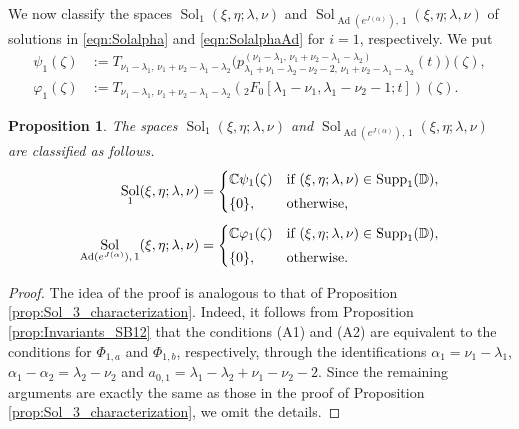 \documentclass[a4paper,11pt,reqno]{amsart}
\newcommand{\DD}{\mathbb{D}}
\newcommand{\0}{{\bf 0}}
\newcommand{\C}{\mathbb{C}}
\newcommand{\1}{{\bf 1}}
\DeclareMathOperator{\Ad}{Ad}
\DeclareMathOperator{\Supp}{Supp}
\DeclareMathOperator{\Sol}{Sol}
\theoremstyle{plain}
\newtheorem{proposition}[equation]{Proposition}
\theoremstyle{definition}
\numberwithin{equation}{section}
\theoremstyle{definition}
\begin{document}
We now classify the spaces 
$\Sol_1(\xi, \eta; \lambda, \nu)$ and 
$\Sol_{\Ad(e^{J(\alpha)}),\, 1}(\xi,\eta; \lambda,\nu)$  of solutions
in \eqref{eqn:Solalpha} and \eqref{eqn:SolalphaAd} for $i=1$, respectively.
We put
\begin{align*}
\psi_1(\zeta) &:= 
T_{\nu_1-\lambda_1,\,\nu_1+\nu_2-\lambda_1-\lambda_2}
\big(p_{\lambda_1+\nu_1-\lambda_2-\nu_2-2,\,\nu_1+\nu_2-\lambda_1-\lambda_2}^{(\nu_1-\lambda_1,\,\nu_1+\nu_2-\lambda_1-\lambda_2)}(t)\big)(\zeta),\\[5pt]
\varphi_1(\zeta)&:= 
T_{\nu_1-\lambda_1,\,\nu_1+\nu_2-\lambda_1-\lambda_2}
({}_2F_0[\lambda_1-\nu_1, \lambda_1-\nu_2-1; t])(\zeta).
\end{align*}

\begin{proposition}\label{prop:Sol_1_characterization}
The spaces $\Sol_1(\xi, \eta; \lambda, \nu)$ and 
$\Sol_{\Ad(e^{J(\alpha)}),\, 1}(\xi,\eta; \lambda,\nu)$ are classified as follows.
\begin{align*}
\Sol_1(\xi, \eta; \lambda, \nu) 
&= 
\begin{cases}
\C\psi_1(\zeta) & \textnormal{if $(\xi, \eta; \lambda, \nu) \in \Supp_1(\DD)$},\\[3pt]
\{0\}, & \textnormal{otherwise,}
\end{cases}\\[3pt]
\Sol_{\Ad(e^{J(\alpha)}),\, 1}(\xi,\eta; \lambda,\nu)
&= 
\begin{cases}
\C\varphi_1(\zeta) & \textnormal{if $(\xi, \eta; \lambda, \nu) \in \Supp_1(\DD)$},\\[3pt]
\{0\}, & \textnormal{otherwise}.
\end{cases}
\end{align*}
\end{proposition}

\begin{proof}
The idea of the proof is analogous to that of 
Proposition \ref{prop:Sol_3_characterization}.
Indeed,
it follows from Proposition \ref{prop:Invariants_SB12} that
the conditions (A1) and (A2) are equivalent to
the conditions for $\Phi_{1,a}$ and $\Phi_{1,b}$, respectively, through
the identifications
$\alpha_1= \nu_1-\lambda_1$, 
$\alpha_1-\alpha_2=\lambda_2-\nu_2$
and
$a_{0,1}=\lambda_1-\lambda_2+\nu_1-\nu_2-2$.
Since the remaining  arguments are exactly the same as those in the proof of Proposition \ref{prop:Sol_3_characterization}, we omit the details.
\end{proof}

\end{document}

